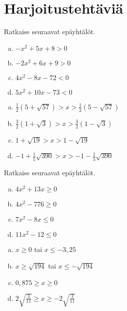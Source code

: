 \section{Harjoitustehtäviä}

\begin{tehtava}
    Ratkaise seuraavat epäyhtälöt.
    \begin{enumerate}[(a)]
        \item $-x^2+5x+8>0$
        \item $-2x^2+6x+9>0$
        \item $4x^2-8x-72<0$
        \item $5x^2+10x-73<0$
    \end{enumerate}
    \begin{vastaus}
        \begin{enumerate}[(a)]
            \item $\frac{1}{2} (5+\sqrt{57}) > x > \frac{1}{2} (5-\sqrt{57})$
            \item $\frac{3}{2} (1+\sqrt{3}) > x > \frac{3}{2} (1-\sqrt{3})$
            \item $1+\sqrt{19} > x > 1-\sqrt{19}$
            \item $-1+\frac{1}{5} \sqrt{390} > x > -1-\frac{1}{5} \sqrt{390}$
        \end{enumerate}
    \end{vastaus}
\end{tehtava}

\begin{tehtava}
    Ratkaise seuraavat epäyhtälöt.
    \begin{enumerate}[(a)]
        \item $4x^2+13x\geq 0$
        \item $4x^2-776\geq 0$
        \item $7x^2-8x\leq 0$
        \item $11x^2-12\leq 0$
    \end{enumerate}
    \begin{vastaus}
        \begin{enumerate}[(a)]
            \item $x \geq 0$ tai $x \leq -3,25$
            \item $x \geq \sqrt{194}$ tai $x \leq -\sqrt{194}$
            \item $0,875 \geq x \geq 0$
            \item $2\sqrt{\frac{3}{11}} \geq x \geq -2\sqrt{\frac{3}{11}}$
        \end{enumerate}
    \end{vastaus}
\end{tehtava}

